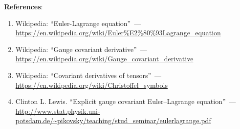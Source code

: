 \documentclass[\docroot/reports/draft/report.tex]{subfiles}
\begin{document}
    \vspace{1cm}

    \textbf{\Large{References}}:
    \begin{enumerate}
        \item Wikipedia: \enquote{Euler-Lagrange equation}~--- \url{https://en.wikipedia.org/wiki/Euler%E2%80%93Lagrange_equation}
        \item Wikipedia: \enquote{Gauge covariant derivative}~--- \url{https://en.wikipedia.org/wiki/Gauge_covariant_derivative}
        \item Wikipedia: \enquote{Covariant derivatives of tensors}~--- \url{https://en.wikipedia.org/wiki/Christoffel_symbols}
        \item Clinton L. Lewis. \enquote{Explicit gauge covariant Euler–Lagrange equation}~--- \url{http://www.stat.physik.uni-potsdam.de/~pikovsky/teaching/stud_seminar/eulerlagrange.pdf}
    \end{enumerate}

\end{document}
